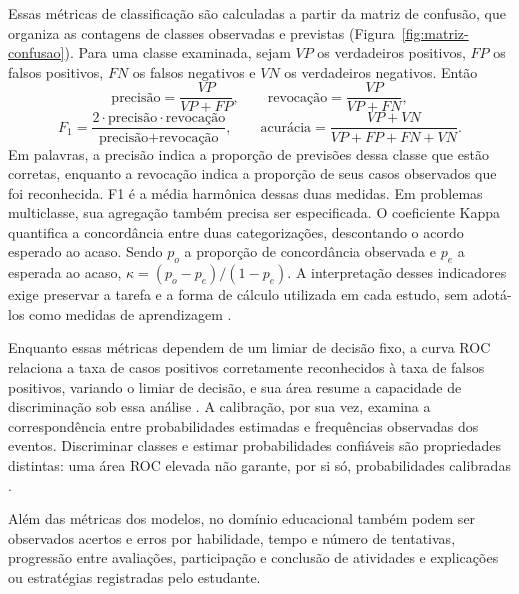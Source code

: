 Essas métricas de classificação são calculadas a partir da matriz de confusão, que organiza as contagens de classes observadas e previstas (Figura~\ref{fig:matriz-confusao}). Para uma classe examinada, sejam $VP$ os verdadeiros positivos, $FP$ os falsos positivos, $FN$ os falsos negativos e $VN$ os verdadeiros negativos. Então
\begin{equation}
\text{precisão} = \frac{VP}{VP + FP}, \qquad \text{revocação} = \frac{VP}{VP + FN},
\label{eq:precisao-revocacao}
\end{equation}
\begin{equation}
F_1 = \frac{2 \cdot \text{precisão} \cdot \text{revocação}}{\text{precisão} + \text{revocação}}, \qquad \text{acurácia} = \frac{VP + VN}{VP + FP + FN + VN}.
\label{eq:f1-acuracia}
\end{equation} Em palavras, a precisão indica a proporção de previsões dessa classe que estão corretas, enquanto a revocação indica a proporção de seus casos observados que foi reconhecida. F1 é a média harmônica dessas duas medidas. Em problemas multiclasse, sua agregação também precisa ser especificada. O coeficiente Kappa quantifica a concordância entre duas categorizações, descontando o acordo esperado ao acaso. Sendo $p_o$ a proporção de concordância observada e $p_e$ a esperada ao acaso, $\kappa = (p_o - p_e)/(1 - p_e)$. A interpretação desses indicadores exige preservar a tarefa e a forma de cálculo utilizada em cada estudo, sem adotá-los como medidas de aprendizagem \cite{ScikitLearnMetrics2025}.



Enquanto essas métricas dependem de um limiar de decisão fixo, a curva ROC relaciona a taxa de casos positivos corretamente reconhecidos à taxa de falsos positivos, variando o limiar de decisão, e sua área resume a capacidade de discriminação sob essa análise \cite{Fawcett2006}. A calibração, por sua vez, examina a correspondência entre probabilidades estimadas e frequências observadas dos eventos. Discriminar classes e estimar probabilidades confiáveis são propriedades distintas: uma área ROC elevada não garante, por si só, probabilidades calibradas \cite{NiculescuMizilCaruana2005}.

Além das métricas dos modelos, no domínio educacional também podem ser observados acertos e erros por habilidade, tempo e número de tentativas, progressão entre avaliações, participação e conclusão de atividades e explicações ou estratégias registradas pelo estudante.

